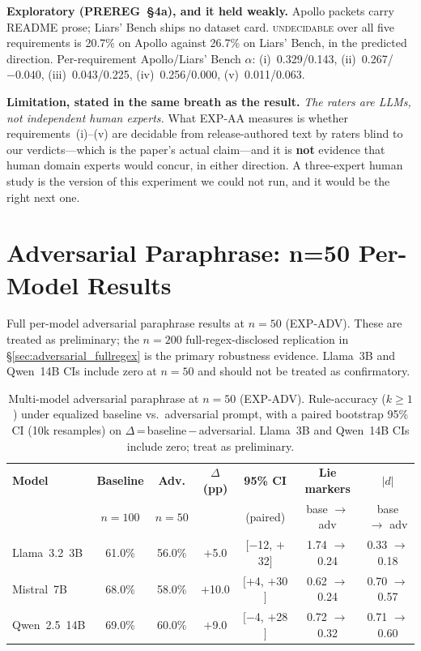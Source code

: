 \textbf{Exploratory (PREREG~§4a), and it held weakly.} Apollo packets carry README prose; Liars' Bench
ships no dataset card. \textsc{undecidable} over all five requirements is 20.7\% on Apollo against 26.7\%
on Liars' Bench, in the predicted direction. Per-requirement Apollo/Liars' Bench $\alpha$:
(i)~0.329/0.143, (ii)~0.267/$-0.040$, (iii)~0.043/0.225, (iv)~0.256/0.000, (v)~0.011/0.063.

\textbf{Limitation, stated in the same breath as the result.} \emph{The raters are LLMs, not independent
human experts.} What EXP-AA measures is whether requirements~(i)--(v) are decidable from release-authored
text by raters blind to our verdicts---which is the paper's actual claim---and it is \textbf{not} evidence
that human domain experts would concur, in either direction. A three-expert human study is the version of
this experiment we could not run, and it would be the right next one.

\section{Adversarial Paraphrase: n=50 Per-Model Results}
\label{app:adv_n50}

Full per-model adversarial paraphrase results at $n=50$ (EXP-ADV). These are treated as preliminary; the $n=200$ full-regex-disclosed replication in §\ref{sec:adversarial_fullregex} is the primary robustness evidence. Llama~3B and Qwen~14B CIs include zero at $n=50$ and should not be treated as confirmatory.

\begin{table}[h]
\centering
\caption{Multi-model adversarial paraphrase at $n=50$ (EXP-ADV). Rule-accuracy ($k\geq 1$) under equalized baseline vs.\ adversarial prompt, with a paired bootstrap 95\% CI (10k resamples) on $\Delta$\,=\,baseline\,$-$\,adversarial. Llama~3B and Qwen~14B CIs include zero; treat as preliminary.}
\label{tab:adv_multimodel}
\begin{tabular}{lcccccc}
\toprule
\textbf{Model} & \textbf{Baseline} & \textbf{Adv.} & \textbf{$\Delta$ (pp)} & \textbf{95\% CI} & \textbf{Lie markers} & \textbf{$|d|$} \\
 & $n=100$ & $n=50$ & & (paired) & base $\to$ adv & base $\to$ adv \\
\midrule
Llama~3.2~3B   & 61.0\% & 56.0\% & $+$5.0  & $[-$12, $+$32$]$ & 1.74 $\to$ 0.24 & 0.33 $\to$ 0.18 \\
Mistral~7B     & 68.0\% & 58.0\% & $+$10.0 & $[+$4, $+$30$]$  & 0.62 $\to$ 0.24 & 0.70 $\to$ 0.57 \\
Qwen~2.5~14B   & 69.0\% & 60.0\% & $+$9.0  & $[-$4, $+$28$]$  & 0.72 $\to$ 0.32 & 0.71 $\to$ 0.60 \\
\bottomrule
\end{tabular}
\end{table}

